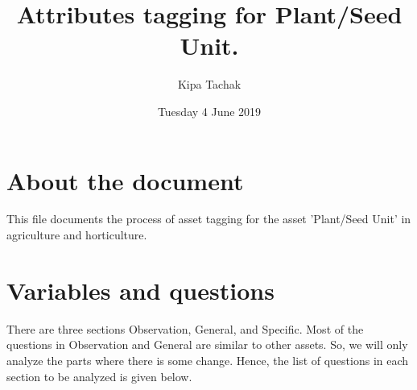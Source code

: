 \documentclass[oneside,twocolumn]{article}
\title{Attributes tagging for Plant/Seed Unit.}
\author{Kipa Tachak}
\date{Tuesday 4 June 2019}
\begin{document}
               \maketitle

               \section{About the document}
               This file documents the process of asset tagging for the asset
               'Plant/Seed Unit' in agriculture and horticulture.
               \section{Variables and questions}
               There are three sections Observation, General, and Specific. Most of
               the questions in Observation and General are similar to other
               assets. So, we will only analyze the parts where there is some
               change. Hence, the list of questions in each section to be
               analyzed is given below.
\end{document}

